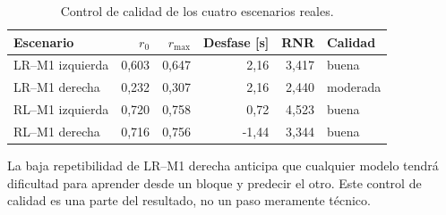 \begin{table}[H]
\centering
\caption{Control de calidad de los cuatro escenarios reales.}
\label{tab:quality_real}
\begin{tabularx}{\textwidth}{Xrrrrl}
\toprule
\textbf{Escenario} & $r_0$ & $r_{\max}$ & \textbf{Desfase [s]} & \textbf{RNR} & \textbf{Calidad} \\
\midrule
LR--M1 izquierda & 0,603 & 0,647 & 2,16 & 3,417 & buena \\
LR--M1 derecha & 0,232 & 0,307 & 2,16 & 2,440 & moderada \\
RL--M1 izquierda & 0,720 & 0,758 & 0,72 & 4,523 & buena \\
RL--M1 derecha & 0,716 & 0,756 & -1,44 & 3,344 & buena \\
\bottomrule
\end{tabularx}
\end{table}

La baja repetibilidad de LR--M1 derecha anticipa que cualquier modelo tendrá dificultad para aprender desde un bloque y predecir el otro. Este control de calidad es una parte del resultado, no un paso meramente técnico.
